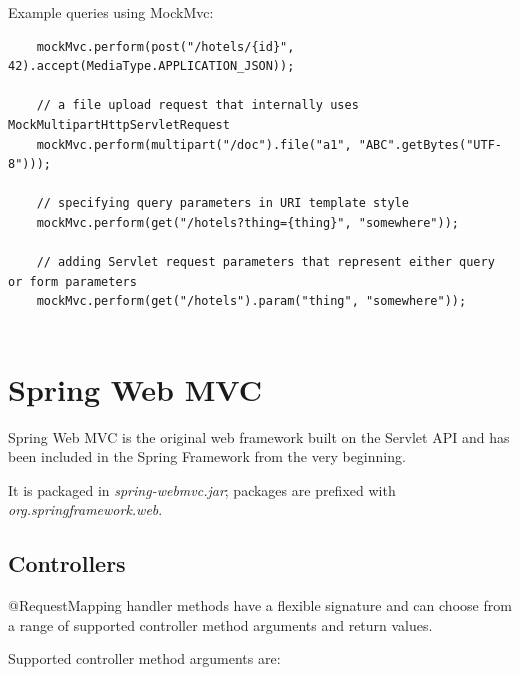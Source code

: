 \documentclass{scrartcl}
\begin{document}
Example queries using MockMvc:

\begin{lstlisting}
    mockMvc.perform(post("/hotels/{id}", 42).accept(MediaType.APPLICATION_JSON));

    // a file upload request that internally uses MockMultipartHttpServletRequest
    mockMvc.perform(multipart("/doc").file("a1", "ABC".getBytes("UTF-8")));

    // specifying query parameters in URI template style
    mockMvc.perform(get("/hotels?thing={thing}", "somewhere"));

    // adding Servlet request parameters that represent either query or form parameters
    mockMvc.perform(get("/hotels").param("thing", "somewhere"));


\end{lstlisting}


\section{Spring Web MVC}

Spring Web MVC is the original web framework built on the Servlet API and has been included in the Spring Framework from the very beginning.

It is packaged in \textit{spring-webmvc.jar}; packages are prefixed with \textit{org.springframework.web}.

\subsection{Controllers}

    @RequestMapping handler methods have a flexible signatu\texttt{}re and can choose from a range of supported controller method arguments and return values.

    Supported controller method arguments are:
\end{document}
